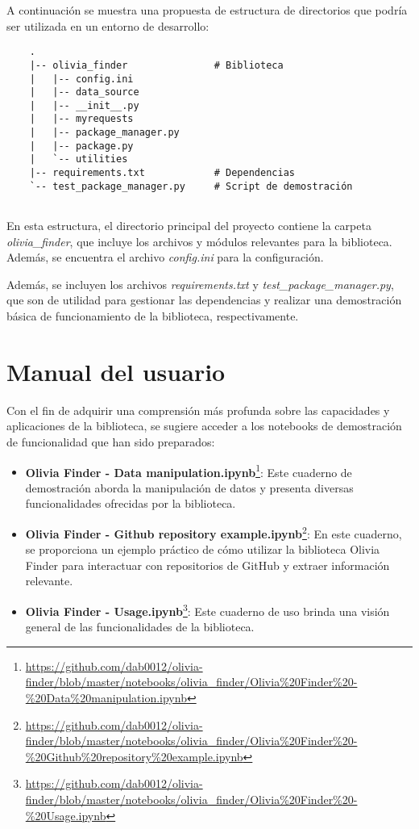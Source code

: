 A continuación se muestra una propuesta de estructura de directorios que podría ser utilizada en un entorno de desarrollo:

\begin{verbatim}
    .
    |-- olivia_finder               # Biblioteca
    |   |-- config.ini
    |   |-- data_source
    |   |-- __init__.py
    |   |-- myrequests
    |   |-- package_manager.py
    |   |-- package.py
    |   `-- utilities
    |-- requirements.txt            # Dependencias
    `-- test_package_manager.py     # Script de demostración
    
\end{verbatim}

En esta estructura, el directorio principal del proyecto contiene la carpeta \textit{olivia\_finder}, que incluye
los archivos y módulos relevantes para la biblioteca. Además, se encuentra el archivo \textit{config.ini} para la configuración.

Además, se incluyen los archivos \textit{requirements.txt} y \textit{test\_package\_manager.py}, que son de utilidad
para gestionar las dependencias y realizar una demostración básica de funcionamiento de la biblioteca, respectivamente.

\section{Manual del usuario}

Con el fin de adquirir una comprensión más profunda sobre las capacidades y aplicaciones de la biblioteca,
se sugiere acceder a los notebooks de demostración de funcionalidad que han sido preparados:


\begin{itemize}
    \item \textbf{Olivia Finder - Data manipulation.ipynb}\footnote{\url{https://github.com/dab0012/olivia-finder/blob/master/notebooks/olivia_finder/Olivia\%20Finder\%20-\%20Data\%20manipulation.ipynb}}:
          Este cuaderno de demostración aborda la manipulación de datos y presenta diversas funcionalidades ofrecidas por la biblioteca.
    \item \textbf{Olivia Finder - Github repository example.ipynb}\footnote{\url{https://github.com/dab0012/olivia-finder/blob/master/notebooks/olivia_finder/Olivia\%20Finder\%20-\%20Github\%20repository\%20example.ipynb}}:
          En este cuaderno, se proporciona un ejemplo práctico de cómo utilizar la biblioteca Olivia Finder para interactuar con repositorios de GitHub y extraer información relevante.
    \item \textbf{Olivia Finder - Usage.ipynb}\footnote{\url{https://github.com/dab0012/olivia-finder/blob/master/notebooks/olivia_finder/Olivia\%20Finder\%20-\%20Usage.ipynb}}:
          Este cuaderno de uso brinda una visión general de las funcionalidades de la biblioteca.
\end{itemize}

